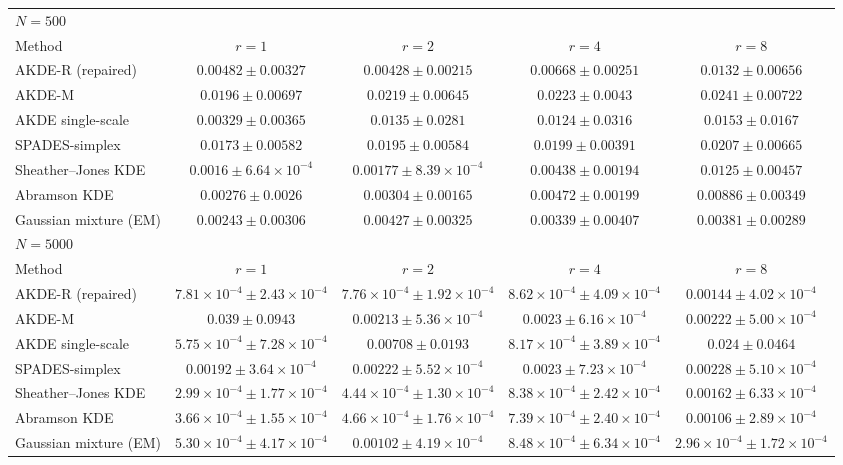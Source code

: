 \begin{tabular}{lcccc}
\toprule
\multicolumn{5}{l}{\emph{$N = 500$}} \\
Method & $r=1$ & $r=2$ & $r=4$ & $r=8$ \\
\midrule
AKDE-R (repaired) & $0.00482 \pm 0.00327$ & $0.00428 \pm 0.00215$ & $0.00668 \pm 0.00251$ & $0.0132 \pm 0.00656$ \\
AKDE-M & $0.0196 \pm 0.00697$ & $0.0219 \pm 0.00645$ & $0.0223 \pm 0.0043$ & $0.0241 \pm 0.00722$ \\
AKDE single-scale & $0.00329 \pm 0.00365$ & $0.0135 \pm 0.0281$ & $0.0124 \pm 0.0316$ & $0.0153 \pm 0.0167$ \\
SPADES-simplex & $0.0173 \pm 0.00582$ & $0.0195 \pm 0.00584$ & $0.0199 \pm 0.00391$ & $0.0207 \pm 0.00665$ \\
Sheather--Jones KDE & $0.0016 \pm 6.64\times10^{-4}$ & $0.00177 \pm 8.39\times10^{-4}$ & $0.00438 \pm 0.00194$ & $0.0125 \pm 0.00457$ \\
Abramson KDE & $0.00276 \pm 0.0026$ & $0.00304 \pm 0.00165$ & $0.00472 \pm 0.00199$ & $0.00886 \pm 0.00349$ \\
Gaussian mixture (EM) & $0.00243 \pm 0.00306$ & $0.00427 \pm 0.00325$ & $0.00339 \pm 0.00407$ & $0.00381 \pm 0.00289$ \\
\midrule
\multicolumn{5}{l}{\emph{$N = 5000$}} \\
Method & $r=1$ & $r=2$ & $r=4$ & $r=8$ \\
\midrule
AKDE-R (repaired) & $7.81\times10^{-4} \pm 2.43\times10^{-4}$ & $7.76\times10^{-4} \pm 1.92\times10^{-4}$ & $8.62\times10^{-4} \pm 4.09\times10^{-4}$ & $0.00144 \pm 4.02\times10^{-4}$ \\
AKDE-M & $0.039 \pm 0.0943$ & $0.00213 \pm 5.36\times10^{-4}$ & $0.0023 \pm 6.16\times10^{-4}$ & $0.00222 \pm 5.00\times10^{-4}$ \\
AKDE single-scale & $5.75\times10^{-4} \pm 7.28\times10^{-4}$ & $0.00708 \pm 0.0193$ & $8.17\times10^{-4} \pm 3.89\times10^{-4}$ & $0.024 \pm 0.0464$ \\
SPADES-simplex & $0.00192 \pm 3.64\times10^{-4}$ & $0.00222 \pm 5.52\times10^{-4}$ & $0.0023 \pm 7.23\times10^{-4}$ & $0.00228 \pm 5.10\times10^{-4}$ \\
Sheather--Jones KDE & $2.99\times10^{-4} \pm 1.77\times10^{-4}$ & $4.44\times10^{-4} \pm 1.30\times10^{-4}$ & $8.38\times10^{-4} \pm 2.42\times10^{-4}$ & $0.00162 \pm 6.33\times10^{-4}$ \\
Abramson KDE & $3.66\times10^{-4} \pm 1.55\times10^{-4}$ & $4.66\times10^{-4} \pm 1.76\times10^{-4}$ & $7.39\times10^{-4} \pm 2.40\times10^{-4}$ & $0.00106 \pm 2.89\times10^{-4}$ \\
Gaussian mixture (EM) & $5.30\times10^{-4} \pm 4.17\times10^{-4}$ & $0.00102 \pm 4.19\times10^{-4}$ & $8.48\times10^{-4} \pm 6.34\times10^{-4}$ & $2.96\times10^{-4} \pm 1.72\times10^{-4}$ \\
\bottomrule
\end{tabular}